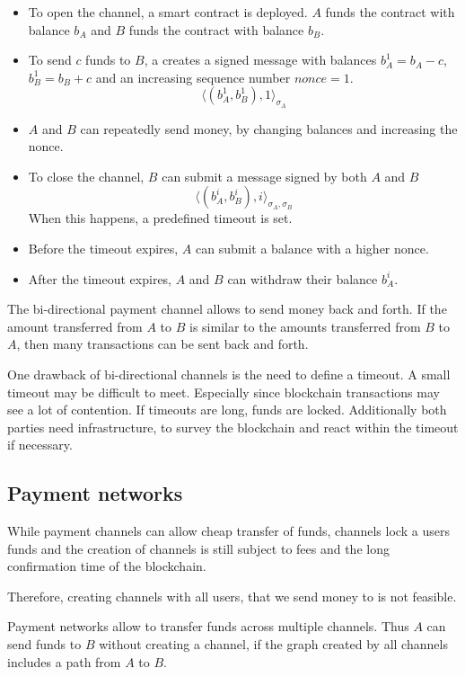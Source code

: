 \begin{itemize}
	\item To open the channel, a smart contract is deployed. $A$ funds the contract with balance $b_A$ and $B$ funds the contract with balance $b_B$.
	\item To send $c$ funds to $B$, a creates a signed message with balances $b_A^1=b_A-c$, $b_B^1=b_B+c$ and an increasing sequence number $nonce=1$.
	\[
		\langle (b_A^1,b_B^1),1\rangle_{\sigma_A}
	\]
	\item $A$ and $B$ can repeatedly send money, by changing balances and increasing the nonce.
	\item To close the channel, $B$ can submit a message signed by both $A$ and $B$
	\[
		\langle (b_A^i,b_B^i),i\rangle_{\sigma_A,\sigma_B}
	\]
	When this happens, a predefined timeout is set.
	\item Before the timeout expires, $A$ can submit a balance with a higher nonce.
	\item After the timeout expires, $A$ and $B$ can withdraw their balance $b_A^i$.
\end{itemize}

\begin{note}
The bi-directional payment channel allows to send money back and forth. If the amount transferred from $A$ to $B$ is similar to the amounts transferred from $B$ to $A$, then many transactions can be sent back and forth.

One drawback of bi-directional channels is the need to define a timeout. 
A small timeout may be difficult to meet. Especially since blockchain transactions may see a lot of contention.
If timeouts are long, funds are locked.
Additionally both parties need infrastructure, to survey the blockchain and react within the timeout if necessary.
\end{note}

\subsection{Payment networks}
While payment channels can allow cheap transfer of funds, channels lock a users funds and the creation of channels is still subject to fees and the long confirmation time of the blockchain.

Therefore, creating channels with all users, that we send money to is not feasible. 

Payment networks allow to transfer funds across multiple channels.
Thus $A$ can send funds to $B$ without creating a channel, if the graph created by all channels includes a path from $A$ to $B$.


